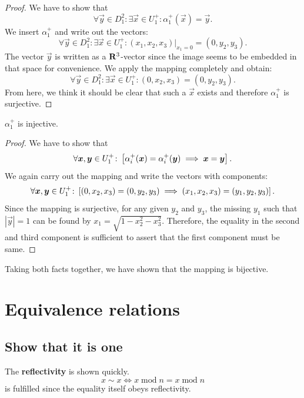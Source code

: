 \documentclass[11pt, english, fleqn, DIV=15, headinclude, BCOR=1cm]{scrartcl}
\begin{document}
\begin{proof}
    We have to show that
    \[
        \forall \vec y \in D_1^2 \colon \exists \vec x \in U_1^+ \colon
        \alpha_1^+(\vec x) = \vec y.
    \]
    We insert $\alpha_1^+$ and write out the vectors:
    \[
        \forall \vec y \in D_1^2 \colon \exists \vec x \in U_1^+ \colon
        (x_1, x_2, x_3)|_{x_1 = 0} = (0, y_2, y_3).
    \]
    The vector $\vec y$ is written as a $\mathbf R^3$-vector since the image seems to
    be embedded in that space for convenience. We apply the mapping completely
    and obtain:
    \[
        \forall \vec y \in D_1^2 \colon \exists \vec x \in U_1^+ \colon
        (0, x_2, x_3) = (0, y_2, y_3).
    \]
    From here, we think it should be clear that such a $\vec x$ exists and
    therefore $\alpha_1^+$ is surjective.
\end{proof}

$\alpha_1^+$ is injective.

\begin{proof}
    We have to show that
    \[
        \forall \boldsymbol{x}, \boldsymbol{y} \in U_1^+ \colon \left[ 
            \alpha_i^+(\boldsymbol{x}) = \alpha_i^+(\boldsymbol{y})
            \implies
            \boldsymbol{x} = \boldsymbol{y}
         \right].
    \]
    We again carry out the mapping and write the vectors with components:
    \[
        \forall \boldsymbol{x}, \boldsymbol{y} \in U_1^+ \colon \left[ 
            (0, x_2, x_3) = (0, y_2, y_3)
            \implies
            (x_1, x_2, x_3) = (y_1, y_2, y_3)
         \right].
    \]
    Since the mapping is surjective, for any given $y_2$ and $y_3$, the missing
    $y_1$ such that $|\vec y| = 1$ can be found by $x_1 = \sqrt{1 - x_2^2 -
    x_3^2}$. Therefore, the equality in the second and third component is
    sufficient to assert that the first component must be same.
\end{proof}

Taking both facts together, we have shown that the mapping is bijective.

\section{Equivalence relations}

\subsection{Show that it is one}

\renewcommand\mod{\operatorname{mod}}

The \textbf{reflectivity} is shown quickly.
\[
    x \sim x \iff x \mod n = x \mod n
\]
is fulfilled since the equality itself obeys reflectivity.
\end{document}
